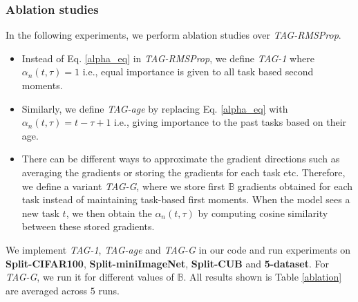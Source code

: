 \documentclass{article} \usepackage{collas2022_conference,times}
\begin{document}
{
\subsubsection{Ablation studies}\label{variant_sec}
In the following experiments, we perform ablation studies over \textit{TAG-RMSProp}. 

\begin{itemize}
    \item Instead of Eq. \ref{alpha_eq} in \textit{TAG-RMSProp}, we define \textit{TAG-1} where $\alpha_n(t,\tau) = 1$ i.e., equal importance is given to all task based second moments.
    \item Similarly, we define \textit{TAG-age} by replacing Eq. \ref{alpha_eq} with $\alpha_n(t,\tau) = t - \tau + 1$ i.e., giving importance to the past tasks based on their age. 
    \item There can be different ways to approximate the gradient directions such as averaging the gradients or storing the gradients for each task etc. Therefore, we define a variant \textit{TAG-G}, where we store first $\mathbb{B}$ gradients obtained for each task instead of maintaining task-based first moments. When the model sees a new task $t$, we then obtain the $\alpha_n(t, \tau)$ by computing cosine similarity between these stored gradients. \end{itemize}

We implement \textit{TAG-1}, \textit{TAG-age} and \textit{TAG-G} in our code and run experiments on \textbf{Split-CIFAR100}, \textbf{Split-miniImageNet}, \textbf{Split-CUB} and \textbf{5-dataset}. For \textit{TAG-G}, we run it for different values of $\mathbb{B}$. All results shown is Table \ref{ablation} are averaged across $5$ runs.


}
\end{document}
